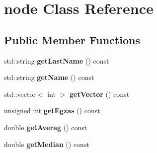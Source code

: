 \hypertarget{classnode}{}\section{node Class Reference}
\label{classnode}
\subsection*{Public Member Functions}
\begin{DoxyCompactItemize}
\item 
\mbox{\label{classnode_acc5355b178d76f1860b416320cacb856}} 
std\+::string {\bfseries get\+Last\+Name} () const
\item 
\mbox{\label{classnode_a57a3ca6657e042e2938c6ea4b473967e}} 
std\+::string {\bfseries get\+Name} () const
\item 
\mbox{\label{classnode_a2ad6eb33eae91037ed7d42ac7751b55a}} 
std\+::vector$<$ int $>$ {\bfseries get\+Vector} () const
\item 
\mbox{\label{classnode_a48daf0edde3ea9fe8d81115bb4497b16}} 
unsigned int {\bfseries get\+Egzas} () const
\item 
\mbox{\label{classnode_ac750e13557624c27f02848d0c989723c}} 
double {\bfseries get\+Averag} () const
\item 
\mbox{\label{classnode_a83c3e1be7db8254f2f06d1f17d0a7904}} 
double {\bfseries get\+Median} () const
\end{DoxyCompactItemize}
